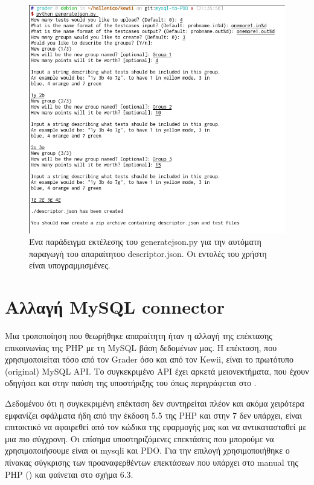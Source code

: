 \documentclass[diploma]{softlab-thesis}
\begin{document}
\begin{figure}
  \centering
  \includegraphics[scale=0.6,trim=4 4 4 4,clip]{Figures/interactive.png}
  \caption[Εκτέλεση διαδραστικού generator αρχείου descriptor.json]{Ένα παράδειγμα
  εκτέλεσης του generatejson.py για την αυτόματη παραγωγή του απαραίτητου
  descriptor.json. Οι εντολές του χρήστη είναι υπογραμμισμένες.}
\end{figure}

\section{Αλλαγή MySQL connector}

Μια τροποποίηση που θεωρήθηκε απαραίτητη ήταν η αλλαγή της επέκτασης
επικοινωνίας της PHP με τη MySQL βάση δεδομένων μας. Η επέκταση, που
χρησιμοποιείται τόσο από τον Grader όσο και από τον Kewii, είναι το πρωτότυπο
(original) MySQL API. Το συγκεκριμένο API έχει αρκετά μειονεκτήματα, που έχουν
οδηγήσει και στην παύση της υποστήριξης του όπως περιγράφεται στο
\cite{deprecation}.

\bigskip

Δεδομένου ότι η συγκεκριμένη επέκταση δεν συντηρείται πλέον και ακόμα χειρότερα
εμφανίζει σφάλματα ήδη από την έκδοση 5.5 της PHP και στην 7 δεν υπάρχει, είναι
επιτακτικό να αφαιρεθεί από τον κώδικα της εφαρμογής μας και να αντικατασταθεί
με μια πιο σύγχρονη. Οι επίσημα υποστηριζόμενες επεκτάσεις που μπορούμε να
χρησιμοποιήσουμε είναι οι mysqli και PDO. Για την επιλογή χρησιμοποιήθηκε ο
πίνακας σύγκρισης των προαναφερθέντων επεκτάσεων που υπάρχει στο manual της PHP
(\cite{mysqlapis}) και φαίνεται στο σχήμα 6.3.
\end{document}
